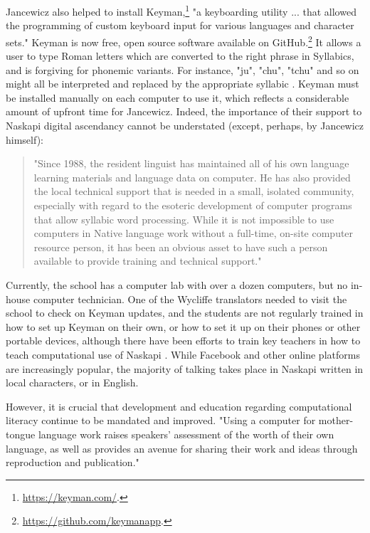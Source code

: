 Jancewicz also helped to install Keyman,\footnote{\href{https://keyman.com/}{https://keyman.com/}. } "a keyboarding utility ... that allowed the programming of custom keyboard input for various languages and character sets." \citep[85]{jancewicz2002applied} Keyman is now free, open source software available on GitHub.\footnote{\href{https://github.com/keymanapp}{https://github.com/keymanapp}. } It allows a user to type Roman letters which are converted to the right phrase in Syllabics, and is forgiving for phonemic variants. For instance, "ju", "chu", "tchu" and so on might all be interpreted and replaced by the appropriate syllabic . %
Keyman must be installed manually on each computer to use it, which reflects a considerable amount of upfront time for Jancewicz. Indeed, the importance of their support to Naskapi digital ascendancy cannot be understated (except, perhaps, by Jancewicz himself):

\begin{quote}
"Since 1988, the resident linguist has maintained all of his own language learning materials and language data on computer. He has also provided the local technical support that is needed in a small, isolated community, especially with regard to the esoteric development of computer programs that allow syllabic word processing. While it is not impossible to use computers in Native language work without a full-time, on-site computer resource person, it has been an obvious asset to have such a person available to provide training and technical support." \citep[86]{jancewicz2002applied}
\end{quote}

Currently, the school has a computer lab with over a dozen computers, but no in-house computer technician. One of the Wycliffe translators needed to visit the school to check on Keyman updates, and the students are not regularly trained in how to set up Keyman on their own, or how to set it up on their phones or other portable devices, although there have been efforts to train key teachers in how to teach computational use of Naskapi \citep{jancewicz1998developing}. While Facebook and other online platforms are increasingly popular, the majority of talking takes place in Naskapi written in local characters, or in English.

However, it is crucial that development and education regarding computational literacy continue to be mandated and improved. "Using a computer for mother-tongue language work raises speakers' assessment of the worth of their own language, as well as provides an avenue for sharing their work and ideas through reproduction and publication." \citet{jancewicz2002applied}

